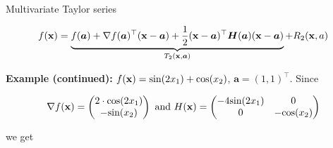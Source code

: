 \begin{vbframe}{Multivariate Taylor series}
\vspace*{-0.7cm}

$$
  f(\mathbf{x}) = \underbrace{f(\bm{a}) + \nabla f(\bm{a})^\top (\mathbf{x} - \bm{a}) + \frac{1}{2}(\mathbf{x} - \bm{a})^\top\bm{H}(\bm{a})(\mathbf{x} - \bm{a})}_{T_2(\mathbf{x}, \bm{a})} + R_2(\mathbf{x}, a) 
$$

\begin{footnotesize}
\textbf{Example (continued):} $f(\mathbf{x}) = \text{sin}(2x_1) + \text{cos}(x_2)$, $\bm{a} = (1, 1)^\top$. Since

$$\nabla f(\mathbf{x}) = \begin{pmatrix} 2\cdot\text{cos}(2x_1) \\ -\text{sin}(x_2) \end{pmatrix}\text{ and } H(\mathbf{x}) = \begin{pmatrix} -4 \text{sin}(2x_1) & 0 \\ 0 & -\text{cos}(x_2) \end{pmatrix} $$
 
we get 

\vspace*{-0.8cm}


\end{footnotesize}
\end{vbframe}
